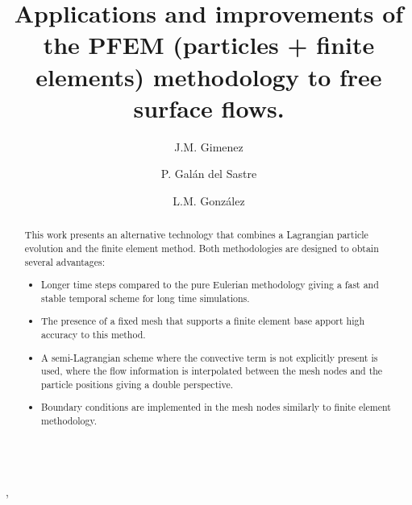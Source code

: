 \documentclass[onecolumn]{elsart3p}
\begin{document}

\begin{frontmatter}

$$\;$$
\vspace{-7cm}
\title{Applications and improvements of the PFEM (particles + finite elements) methodology to free surface flows.}
%
%
\author{J.M. Gimenez},
\address{CIMEC,
Universidad Nacional del Litoral (UNL). Santa F\'{e}, Argentina.}
%
\author{P. Gal\'{a}n del Sastre}
\address{Naval Architecture Department (ETSIN),
Technical University of Madrid (UPM). 28040 Madrid, Spain.}

\author{L.M. Gonz\'{a}lez}
 
\address{Naval Architecture Department (ETSIN),
Technical University of Madrid (UPM). 28040 Madrid, Spain.}
%
\vspace{-0.8cm}
\begin{abstract}

This work presents an alternative technology that combines a Lagrangian particle evolution and the finite element method. Both methodologies are designed to obtain several advantages:

\begin{itemize}
  \item Longer time steps compared to the pure Eulerian methodology giving a fast and stable temporal scheme for long time simulations.
  \item The presence of a fixed mesh that supports a finite element base apport high accuracy to this method.
  \item A semi-Lagrangian scheme where the convective term is not explicitly present is used, where the flow information is interpolated between the mesh nodes and the particle positions giving a double perspective.
  \item Boundary conditions are implemented in the mesh nodes similarly to finite element methodology.
\end{itemize}


\end{abstract}
\end{frontmatter}
\end{document}
